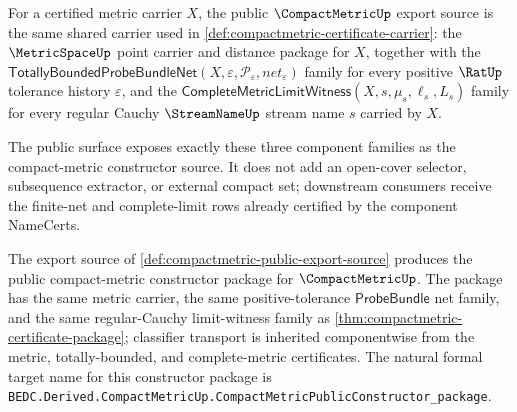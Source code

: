 \begin{definition}
\label{def:compactmetric-public-export-source}
For a certified metric carrier $X$, the public $\CompactMetricUp$ export
source is the same shared carrier used in
\autoref{def:compactmetric-certificate-carrier}: the $\MetricSpaceUp$ point
carrier and distance package for $X$, together with the
$\mathsf{TotallyBoundedProbeBundleNet}(X,\varepsilon,\mathcal{P}_{\varepsilon},net_{\varepsilon})$
family for every positive $\RatUp$ tolerance history $\varepsilon$, and the
$\mathsf{CompleteMetricLimitWitness}(X,s,\mu_s,\ell_s,L_s)$ family for every
regular Cauchy $\StreamNameUp$ stream name $s$ carried by $X$.

The public surface exposes exactly these three component families as the
compact-metric constructor source. It does not add an open-cover selector,
subsequence extractor, or external compact set; downstream consumers receive
the finite-net and complete-limit rows already certified by the component
NameCerts.
\end{definition}

\begin{theorem}
\label{thm:compactmetric-public-constructor-package}
The export source of \autoref{def:compactmetric-public-export-source}
produces the public compact-metric constructor package for $\CompactMetricUp$.
The package has the same metric carrier, the same positive-tolerance
$\mathsf{ProbeBundle}$ net family, and the same regular-Cauchy limit-witness
family as \autoref{thm:compactmetric-certificate-package}; classifier
transport is inherited componentwise from the metric, totally-bounded, and
complete-metric certificates. The natural formal target name for this
constructor package is
\texttt{BEDC.Derived.CompactMetricUp.CompactMetricPublicConstructor\_package}.
\end{theorem}

